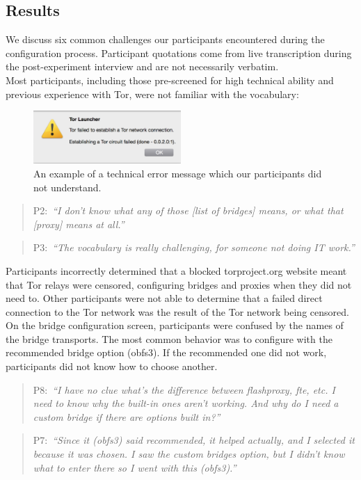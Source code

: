 \documentclass[USenglish,oneside,twocolumn]{article}
\newcommand{\pquote}[2]{
\begin{quotation}
\noindent #1:~\textit{``#2''}
\end{quotation}
}
\begin{document}
\subsection{Results} 
We discuss six common challenges our participants encountered during the configuration process.
Participant quotations come from live transcription during the post-experiment interview
and are not necessarily verbatim.\\

Most participants, including those pre-screened for high technical ability and previous experience with Tor, were not familiar with the vocabulary:

\begin{figure}[t]
  \centering
    \includegraphics[width=0.5\textwidth]{error.png}
    \caption{An example of a technical error message which our participants did not understand.}
\label{fig:error}
\end{figure}

\pquote{P2}{I don't know what any of those [list of bridges] means, or what that [proxy] means at all.}
\pquote{P3}{The vocabulary is really challenging, for someone not doing IT work.}

Participants incorrectly determined that a blocked torproject.org website meant that Tor relays were censored, configuring bridges and proxies when they did not need to. Other participants were not able to determine that a failed direct connection to the Tor network was the result of the Tor network being censored. \\

On the bridge configuration screen, participants were confused by the names of the bridge transports. The most common behavior was to configure with the recommended bridge option (obfs3). If the recommended one did not work, participants did not know how to choose another. 

\pquote{P8}{I have no clue what's the difference between flashproxy, fte, etc. I need to know why the built-in ones aren't working. And why do I need a custom bridge if there are options built in?}
\pquote{P7}{Since it (obfs3) said recommended, it helped actually, and I selected it because it was chosen. I saw the custom bridges option, but I didn't know what to enter there so I went with this (obfs3).}
\end{document}
